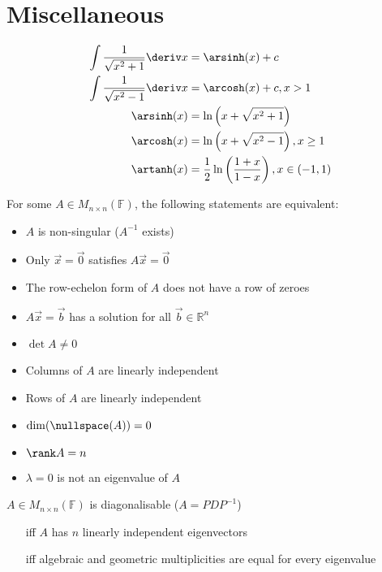 \documentclass[10pt, a4paper]{article}
\newlength{\interwordspace}
\begin{document}
\section{Miscellaneous}
\begin{multicols}{2}
    
    \begin{align*}
        \int \frac{1}{\sqrt{x^2 + 1}} \deriv x &= \arsinh(x) + c \\
        \int \frac{1}{\sqrt{x^2 - 1}} \deriv x &= \arcosh(x) + c, x > 1 \\
        \arsinh(x) &= \ln \left(x + \sqrt{x^2 + 1}\right) \\
        \arcosh(x) &= \ln \left(x + \sqrt{x^2 - 1}\right), x \geq 1 \\
        \artanh(x) &= \frac{1}{2} \ln \left(\frac{1 + x}{1 - x}\right), x \in (-1, 1) \\
    \end{align*}

    For some \(A \in M_{n \times n}(\mathbb{F})\), the following statements are equivalent:
    \begin{itemize}
        \item \(A\) is non-singular (\(A^{-1}\) exists)
        \item Only \(\vec{x} = \vec{0}\) satisfies \(A \vec{x} = \vec{0}\)
        \item The row-echelon form of \(A\) does not have a row of zeroes
        \item \(A \vec{x} = \vec{b}\) has a solution for all \(\vec{b} \in \mathbb{R}^n\)
        \item \(\det A \neq 0\)
        \item Columns of \(A\) are linearly independent
        \item Rows of \(A\) are linearly independent
        \item \(\dim(\nullspace(A)) = 0\)
        \item \(\rank A = n\)
        \item \(\lambda = 0\) is not an eigenvalue of \(A\)
    \end{itemize}
    \vfill\columnbreak

    \(A \in M_{n \times n}(\mathbb{F})\) is diagonalisable (\(A = PDP^{-1}\))
    \begin{itemize}[leftmargin=1.0cm, labelsep=\interwordspace]
        \item[iff] \(A\) has \(n\) linearly independent eigenvectors
        \item[iff] algebraic and geometric multiplicities are equal for every eigenvalue
    \end{itemize}


\end{multicols}
\end{document}
